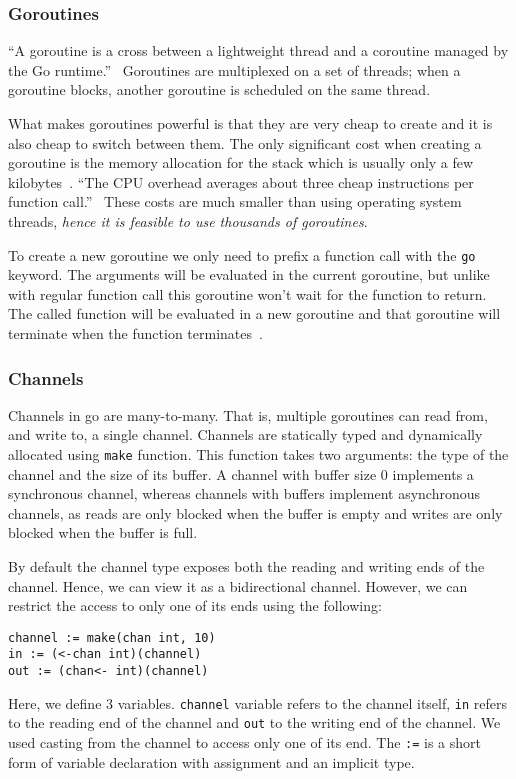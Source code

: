 \subsubsection{Goroutines}
``A goroutine is a cross between a lightweight thread and a coroutine
managed by the Go runtime.''~\cite[2]{whitehead} Goroutines are multiplexed
on a set of threads; when a goroutine blocks, another goroutine is scheduled
on the same thread. 

What makes goroutines powerful is that they are very cheap to create and 
it is also cheap to switch between them. The only significant cost when 
creating a goroutine is the memory allocation for the stack which is 
usually only a few kilobytes~\cite{FAQ}. ``The CPU overhead averages about 
three cheap instructions per function call.''~\cite{FAQ} These costs are much 
smaller than using operating system threads, \textit{hence it is feasible to use 
thousands of goroutines}.

To create a new goroutine we only need to prefix a function call with
the \texttt{go} keyword. The arguments will be evaluated in the current
goroutine, but unlike with regular function call this goroutine won't
wait for the function to return. The called 
function will be evaluated in a new goroutine and that goroutine will 
terminate when the function terminates~\cite{GoDocumentation}.

\subsubsection{Channels}
Channels in go are many-to-many. That is, multiple goroutines can
read from, and write to, a single channel. Channels are statically typed and
dynamically allocated using \texttt{make} function. This function takes 
two arguments: the type of the channel and the size of its buffer.
A channel with buffer size 0 implements a synchronous channel, whereas 
channels with buffers implement asynchronous channels, as reads
are only blocked when the buffer is empty and writes are only blocked
when the buffer is full.

By default the channel type exposes both the reading and writing ends of the
channel. Hence, we can view it as a bidirectional channel. 
However, we can restrict the access to only one of its ends using the following:
\begin{lstlisting}
channel := make(chan int, 10)
in := (<-chan int)(channel)
out := (chan<- int)(channel)
\end{lstlisting}
Here, we define 3 variables. \texttt{channel} variable refers to the 
channel itself, \texttt{in} refers to the reading end of the channel
and \texttt{out} to the writing end of the channel. We used casting
from the channel to access only one of its end. The \texttt{:=} is a
short form of variable declaration with assignment and an implicit type.

